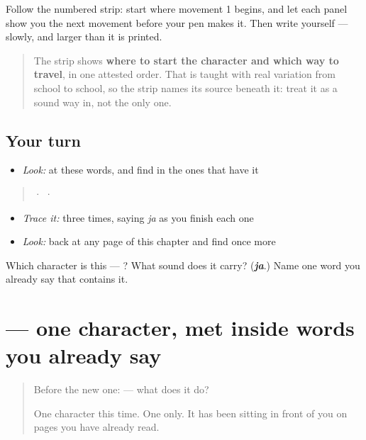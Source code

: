 Follow the numbered strip: start where movement 1 begins, and let each panel show you the next movement before your pen makes it. Then write  yourself — slowly, and larger than it is printed.

\begin{quote}
The strip shows \textbf{where to start the character and which way to travel}, in one attested order. That is taught with real variation from school to school, so the strip names its source beneath it: treat it as a sound way in, not the only one.
\end{quote}

\subsection*{Your turn}
\begin{itemize}
\raggedright
  \item \emph{Look:} at these words, and find  in the ones that have it
\end{itemize}

\begin{quote}
   ·    ·  
\end{quote}

\begin{itemize}
\raggedright
  \item \emph{Trace it:}  three times, saying \emph{ja} as you finish each one
  \item \emph{Look:} back at any page of this chapter and find  once more
\end{itemize}

\begin{tcolorbox}[breakable,colback=teal!4,colframe=teal!35!black,title={Before you move on}]
Which character is this — ? What sound does it carry? (\emph{\textbf{ja}}.) Name one word you already say that contains it.
\end{tcolorbox}
\section[\texorpdfstring{\ml{ല} (la)}{ല (la)}]{ — one character, met inside words you already say}

\label{lesson:ML-S146-letter-la}



\begin{quote}
Before the new one:  — what does it do?

One character this time. One only. It has been sitting in front of you on pages you have already read.
\end{quote}

